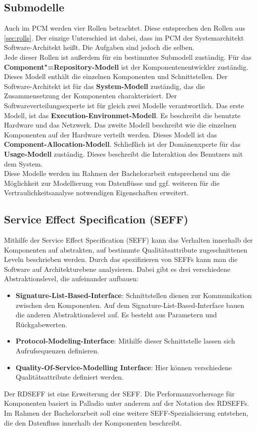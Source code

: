 \subsection{Submodelle}
Auch im PCM werden vier Rollen betrachtet. Diese entsprechen den Rollen aus \ref{sec:rolls}. Der einzige Unterschied ist dabei, dass im PCM der Systemarchitekt Software-Architekt heißt. Die Aufgaben sind jedoch die selben.  \\
Jede dieser Rollen ist außerdem für ein bestimmtes Submodell zuständig.
Für das \textbf{Component"=Repository-Modell} ist der Komponentenentwickler zuständig. Dieses Modell enthält die einzelnen Komponenten und Schnittstellen. Der Software-Architekt ist für das \textbf{System-Modell} zuständig, das die Zusammensetzung der Komponenten charakterisiert. Der Softwareverteilungsexperte ist für gleich zwei Modelle verantwortlich. Das erste Modell, ist das \textbf{Execution-Environmet-Modell}. Es beschreibt die benutzte Hardware und das Netzwerk. Das zweite Modell beschreibt wie die einzelnen Komponenten auf der Hardware verteilt werden. Dieses Modell ist das \textbf{Component-Allocation-Modell}. Schließlich ist der Domänenxperte für das \textbf{Usage-Modell} zuständig. Dieses beschreibt die Interaktion des Benutzers mit dem System. \\
Diese Modelle werden im Rahmen der Bachelorarbeit entsprechend um die Möglichkeit zur Modellierung von Datenflüsse und ggf. weiteren für die Vertraulichkeitsanalyse notwendigen Eigenschaften erweitert.

\subsection{Service Effect Specification (SEFF)}
Mithilfe der Service Effect Specification (SEFF) \cite{Reussner} kann das Verhalten innerhalb der Komponenten auf abstrakten, auf bestimmte Qualitätsattribute zugeschnittenen Leveln beschrieben werden. 
Durch das spezifizieren von SEFFs kann man die Software auf Architekturebene analysieren. Dabei gibt es drei verschiedene Abstraktionslevel, die aufeinander aufbauen:
\begin{itemize}
\item \textbf{Signature-List-Based-Interface}: Schnittstellen dienen zur Kommunikation zwischen den Komponenten. Auf dem Signature-List-Based-Interface bauen die anderen Abstraktionslevel auf. Es besteht aus Parametern und Rückgabewerten.
\item \textbf{Protocol-Modeling-Interface}: Mithilfe dieser Schnittstelle lassen sich Aufrufsequenzen definieren.
\item \textbf{Quality-Of-Service-Modelling Interface}: Hier können verschiedene Qualitätsattribute definiert werden.
\end{itemize}
Der RDSEFF ist eine Erweiterung der SEFF. Die Performanzvorhersage für Komponenten basiert in Palladio unter anderem auf der Notation des RDSEFFs. \\
Im Rahmen der Bachelorarbeit soll eine weitere SEFF-Spezialisierung entstehen, die den Datenfluss innerhalb der Komponenten beschreibt.

